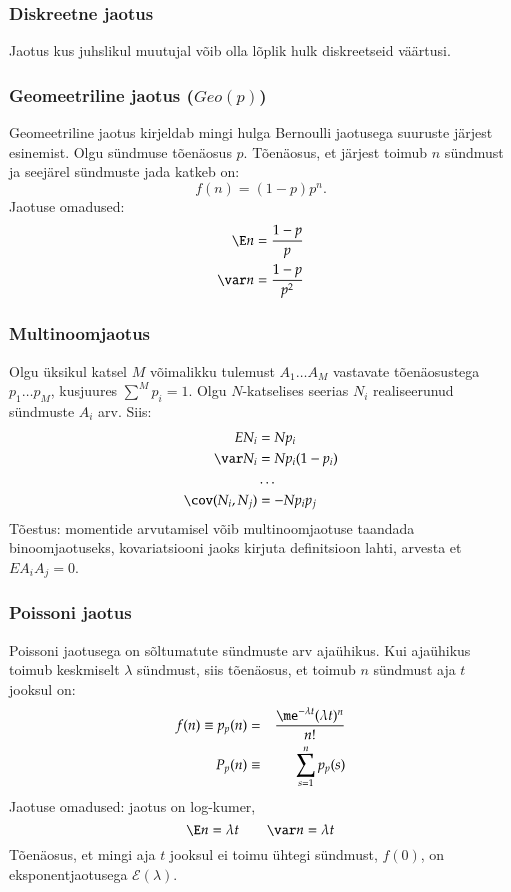 \documentclass[a4paper]{article}
\numberwithin{equation}{subsection}
\begin{document}
\subsubsection{Diskreetne jaotus}
Jaotus kus juhslikul muutujal võib olla lõplik hulk diskreetseid
väärtusi. 

\subsubsection{Geomeetriline jaotus ($Geo(p)$)}
Geomeetriline jaotus kirjeldab mingi hulga Bernoulli jaotusega
suuruste järjest esinemist.  Olgu sündmuse tõenäosus $p$.  Tõenäosus,
et järjest toimub $n$ sündmust ja seejärel sündmuste jada katkeb on:
\begin{equation}
f(n) = (1-p)p^n.
\end{equation}
Jaotuse omadused:
\begin{eqnarray}
\E n = \frac{1-p}{p}\\
\var n = \frac{1-p}{p^2}
\end{eqnarray}


\subsubsection{Multinoomjaotus}
Olgu üksikul katsel $M$ võimalikku tulemust $A_1 \ldots A_M$ vastavate
tõenäosustega $p_1 \ldots p_M$, kusjuures $\sum^M p_i = 1$.  Olgu
$N$-katselises seerias $N_i$  realiseerunud sündmuste $A_i$ arv.
Siis:
\begin{align}
E N_i &= Np_i \\
\var N_i &= N p_i ( 1 - p_i) \\
&\ldots \notag\\
\cov( N_i, N_j) &= -N p_i p_j
\end{align}
Tõestus: momentide arvutamisel võib multinoomjaotuse taandada
binoomjaotuseks, kovariatsiooni jaoks kirjuta definitsioon lahti,
arvesta et $E A_i A_j = 0$.


\subsubsection{Poissoni jaotus}
Poissoni jaotusega on sõltumatute sündmuste arv ajaühikus.  Kui
ajaühikus toimub keskmiselt $\lambda$ sündmust, siis tõenäosus, et
toimub $n$ sündmust aja $t$ jooksul on:
\begin{eqnarray}
f(n)\equiv p_p(n) &=& \frac{\me^{-\lambda t}(\lambda t)^n}{n!}\\
P_p(n) &\equiv& \sum_{s=1}^n p_p(s)
\end{eqnarray}
Jaotuse omadused: jaotus on log-kumer,
\begin{equation}
  \E n = \lambda t \qquad \var n = \lambda t
\end{equation}
Tõenäosus, et mingi aja $t$ jooksul ei toimu ühtegi sündmust, $f(0)$, on
eksponentjaotusega $\mathcal{E}(\lambda)$.
\end{document}
